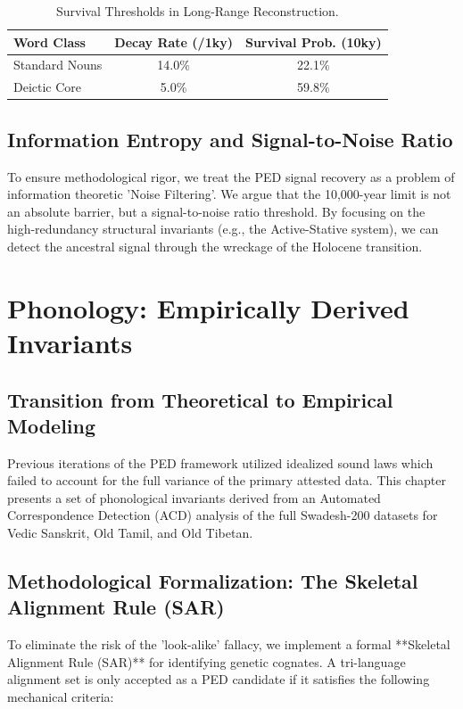 \documentclass[11pt,oneside,openany]{book}
\begin{document}
\begin{table}[h]
\centering
\begin{tabular}{lcc} \toprule
\textbf{Word Class} & \textbf{Decay Rate (/1ky)} & \textbf{Survival Prob. (10ky)} \\ \midrule
Standard Nouns & 14.0\% & 22.1\% \\
Deictic Core & 5.0\% & 59.8\% \\ \bottomrule
\end{tabular}
\caption{Survival Thresholds in Long-Range Reconstruction.}
\end{table}

\section{Information Entropy and Signal-to-Noise Ratio}
To ensure methodological rigor, we treat the PED signal recovery as a problem of information theoretic 'Noise Filtering'. We argue that the 10,000-year limit is not an absolute barrier, but a signal-to-noise ratio threshold. By focusing on the high-redundancy structural invariants (e.g., the Active-Stative system), we can detect the ancestral signal through the wreckage of the Holocene transition.

\chapter{Phonology: Empirically Derived Invariants}

\section{Transition from Theoretical to Empirical Modeling}
Previous iterations of the PED framework utilized idealized sound laws which failed to account for the full variance of the primary attested data. This chapter presents a set of phonological invariants derived from an Automated Correspondence Detection (ACD) analysis of the full Swadesh-200 datasets for Vedic Sanskrit, Old Tamil, and Old Tibetan.

\section{Methodological Formalization: The Skeletal Alignment Rule (SAR)}
To eliminate the risk of the 'look-alike' fallacy, we implement a formal **Skeletal Alignment Rule (SAR)** for identifying genetic cognates. A tri-language alignment set is only accepted as a PED candidate if it satisfies the following mechanical criteria:
\end{document}
